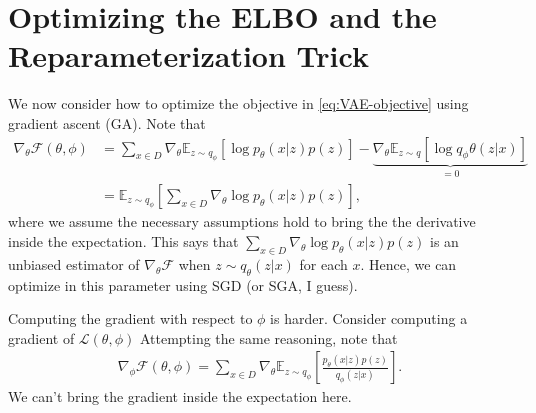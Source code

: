 \documentclass{article}
\newcommand{\E}{\mathbb{E}}
\newcommand{\grad}{\nabla}
\newcommand{\calL}{\mathcal{L}}
\newcommand{\calF}{\mathcal{F}}
\begin{document}
\section{Optimizing the ELBO and the Reparameterization Trick}
We now consider how to optimize the objective in \eqref{eq:VAE-objective} using gradient ascent (GA). Note that
\begin{align}
\grad_\theta \calF(\theta, \phi) & = \sum_{x\in D} \grad_\theta \E_{z\sim q_\phi}\left[ \log p_\theta(x|z)p(z)\right] - \underbrace{\grad_\theta\E_{z\sim q}\left[ \log q_\phi\theta(z|x)\right]}_{=0}\\ 
& =  \E_{z\sim q_\phi}\left[ \sum_{x\in D}\grad_\theta \log p_\theta(x|z)p(z)\right],
\end{align}
where we assume the necessary assumptions hold to bring the the derivative inside the expectation.
This says that $\sum_{x\in D} \grad_\theta \log p_\theta(x|z)p(z)$ is an unbiased estimator of $\grad_\theta \calF$ when $z\sim q_\theta(z|x)$ for each $x$. Hence, we can optimize in this parameter using SGD (or SGA, I guess). 

Computing the gradient with respect to $\phi$ is harder. Consider computing a gradient of $\calL(\theta, \phi)$ Attempting the same reasoning, note that
\begin{align}
    \grad_\phi \calF(\theta, \phi) = \sum_{x\in D} \grad_\theta \E_{z\sim q_\phi }\left[ \frac{p_\theta(x|z)p(z)}{q_\phi(z|x)} \right].
\end{align}
We can't bring the gradient inside the expectation here. 
\end{document}
